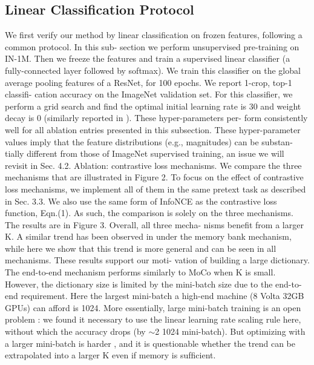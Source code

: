 \documentclass[10pt,twocolumn]{article}  %
\begin{document}
\subsection{Linear Classiﬁcation Protocol}
We first verify our method by linear classification on
frozen features, following a common protocol. In this sub-
section we perform unsupervised pre-training on IN-1M.
Then we freeze the features and train a supervised linear
classifier (a fully-connected layer followed by softmax). We
train this classifier on the global average pooling features of
a ResNet, for 100 epochs. We report 1-crop, top-1 classifi-
cation accuracy on the ImageNet validation set.
For this classifier, we perform a grid search and find the
optimal initial learning rate is 30 and weight decay is 0
(similarly reported in \cite{56_tian2019contrastive}). These hyper-parameters per-
form consistently well for all ablation entries presented in
this subsection. These hyper-parameter values imply that
the feature distributions (e.g., magnitudes) can be substan-
tially different from those of ImageNet supervised training,
an issue we will revisit in Sec. 4.2.
Ablation: contrastive loss mechanisms. We compare the
three mechanisms that are illustrated in Figure 2. To focus
on the effect of contrastive loss mechanisms, we implement
all of them in the same pretext task as described in Sec. 3.3.
We also use the same form of InfoNCE as the contrastive
loss function, Eqn.(1). As such, the comparison is solely on
the three mechanisms.
The results are in Figure 3. Overall, all three mecha-
nisms beneﬁt from a larger K. A similar trend has been
observed in \cite{61_wu2018unsupervised, 56_tian2019contrastive} under the memory bank mechanism,
while here we show that this trend is more general and can
be seen in all mechanisms. These results support our moti-
vation of building a large dictionary.
The end-to-end mechanism performs similarly to MoCo
when K is small. However, the dictionary size is limited
by the mini-batch size due to the end-to-end requirement.
Here the largest mini-batch a high-end machine (8 Volta
32GB GPUs) can afford is 1024. More essentially, large
mini-batch training is an open problem \cite{25_goyal2017accurate}: we found it
necessary to use the linear learning rate scaling rule \cite{25_goyal2017accurate}
here, without which the accuracy drops (by $\sim$2%
1024 mini-batch). But optimizing with a larger mini-batch
is harder \cite{25_goyal2017accurate}, and it is questionable whether the trend can
be extrapolated into a larger K even if memory is sufﬁcient.
\end{document}
